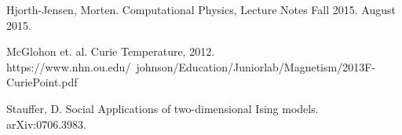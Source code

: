 \documentclass[%
oneside,                 %
final,                   %
10pt]{article}
\begin{document}
\begin{comment}

\begin{figure}[H]\label{fig:compzoom}
  \centering
    \texttt{[image: compzoom.eps]}
    \caption{A zoomed in view of the convergence to the exact solution}
\end{figure}

\begin{center} 
\begin{tabular}{ |c|c|c|c| }
\hline
Size of Matrix ($10^n$) & General & Tailored & LU \\
\hline
1& 3.00 E -6 & 3.00 E -6 & 2.40 E -5\\ 
2 & 4.00 E -6 & 4.00 E -6 & 1.71 E -3 \\ 
3 & 3.90 E -5 & 1.90 E -5 & 1.93\\ 
4 & 3.79 E -4 & 2.09 E -4 & N/A\\ 
5 & 3.38 E -3 & 1.51 E -3  & N/A\\ 
6 & 2.87 E -2 & 1.53 E -2 & N/A\\ 
7 & 3.16 E -1 & 1.73 E -1& N/A\\ 
\hline
\end{tabular}
\label{table:test}
\end{center}

\end{comment}

\begin{thebibliography}{9}

Hjorth-Jensen, Morten. 
Computational Physics, Lecture Notes Fall 2015. 
August 2015.

McGlohon et. al.
Curie Temperature, 2012.
https://www.nhn.ou.edu/~johnson/Education/Juniorlab/Magnetism/2013F-CuriePoint.pdf

Stauffer, D.
Social Applications of two-dimensional Ising models.
arXiv:0706.3983.

\end{thebibliography}



\end{document}
